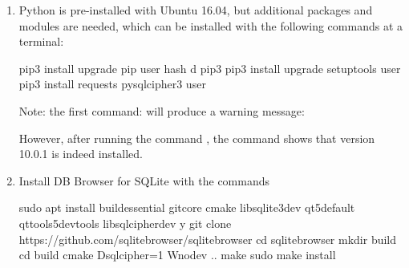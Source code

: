 \documentclass[letterpaper,12pt,english]{sphinxmanual}
\begin{document}
\begin{enumerate}
\item {} 
Python is pre-installed with Ubuntu 16.04, but additional packages and modules are needed, which can be installed
with the following commands at a terminal:

%
\begin{sphinxVerbatim}[commandchars=\\\{\}]
\PYGZdl{} pip3 install \PYGZhy{}\PYGZhy{}upgrade pip \PYGZhy{}\PYGZhy{}user
\PYGZdl{} hash \PYGZhy{}d pip3
\PYGZdl{} pip3 install \PYGZhy{}\PYGZhy{}upgrade setuptools \PYGZhy{}\PYGZhy{}user
\PYGZdl{} pip3 install requests pysqlcipher3 \PYGZhy{}\PYGZhy{}user
\end{sphinxVerbatim}

Note: the first command:  will produce a warning message:

%
\begin{sphinxVerbatim}[commandchars=\\\{\}]
          
       
\end{sphinxVerbatim}

However, after running the command , the command  shows that version 10.0.1 is
indeed installed.

\item {} 
Install DB Browser for SQLite with the commands

%
\begin{sphinxVerbatim}[commandchars=\\\{\}]
\PYGZdl{} sudo apt install build\PYGZhy{}essential git\PYGZhy{}core cmake libsqlite3\PYGZhy{}dev qt5\PYGZhy{}default qttools5\PYGZhy{}dev\PYGZhy{}tools libsqlcipher\PYGZhy{}dev \PYGZhy{}y
\PYGZdl{} git clone https://github.com/sqlitebrowser/sqlitebrowser
\PYGZdl{} cd sqlitebrowser
\PYGZdl{} mkdir build
\PYGZdl{} cd build
\PYGZdl{} cmake \PYGZhy{}Dsqlcipher=1 \PYGZhy{}Wno\PYGZhy{}dev ..
\PYGZdl{} make
\PYGZdl{} sudo make install
\end{sphinxVerbatim}

\end{enumerate}
\end{document}
